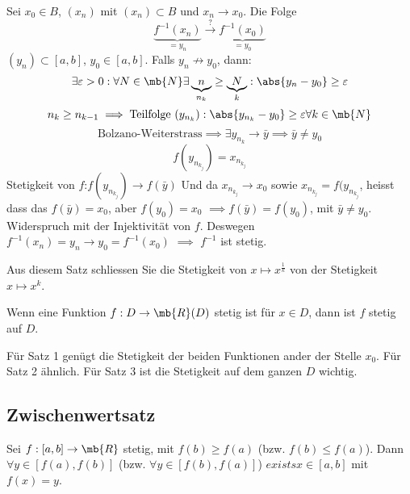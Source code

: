 \begin{Bew}
  Sei $x_0\in B$, $(x_n)$ mit $(x_n)\subset B$ und $x_n\to x_0$. Die Folge
  \[\underbrace{f^{-1}(x_n)}_{=y_n}\stackrel{?}{\to}\underbrace{f^{-1}(x_0)}_{=y_0}\]
  $(y_n)\subset\left[ a,b \right]$, $y_0\in\left[ a,b \right]$. Falls $y_n\not\to y_0$, dann:
  \[\exists\varepsilon>0: \forall N\in\mb{N}\exists \underbrace{n}_{n_k}\geq \underbrace{N}_{k}: \abs{y_n-y_0}\geq\varepsilon\]
  \[n_k\geq n_{k-1}\implies\text{Teilfolge } (y_{n_k}): \abs{y_{n_k}-y_0}\geq \varepsilon\forall k\in \mb{N}\]
  \[\text{Bolzano-Weiterstrass}\implies \exists y_{n_k}\to\bar{y}\implies \bar{y}\neq y_0\]
  \[f(y_{n_{k_j}})=x_{n_{k_j}}\]
  Stetigkeit von $f$:$f(y_{n_{k_j}})\to f(\bar y)$ Und da $x_{n_{k_j}}\to x_0$ sowie  $x_{n_{k_j}} = f(y_{n_{k_j}}$, heisst dass das $f(\bar y)=x_0$, aber $f(y_0)=x_0$ $\implies f(\bar y)=f(y_0)$, mit $\bar y\neq y_0$. Widerspruch mit der Injektivität von $f$. Deswegen $f^{-1}(x_n)=y_n\to y_0=f^{-1}(x_0)$ $\implies$ $f^{-1}$ ist stetig.
\end{Bew}
\begin{Bem}
  Aus diesem Satz schliessen Sie die Stetigkeit von $x\mapsto x^{\frac{1}{k}}$ von der Stetigkeit $x\mapsto x^k$.
\end{Bem}
\begin{Def}
  Wenn eine Funktion $f:D\to\mb{R}(D)$ stetig ist für $x\in D$, dann ist $f$ stetig auf $D$.
\end{Def}
\begin{Bem}
  Für Satz 1 genügt die Stetigkeit der beiden Funktionen ander der Stelle $x_0$. Für Satz 2 ähnlich. Für Satz 3 ist die Stetigkeit auf dem ganzen $D$ wichtig.
\end{Bem}
\subsection{Zwischenwertsatz}
\begin{Sat}
  Sei $f:\left[ a,b \right]\to\mb{R}$ stetig, mit $f(b)\geq f(a)$ (bzw. $f(b)\leq f(a)$). Dann $\forall y\in\left[ f(a),f(b) \right]$ (bzw. $\forall y\in\left[ f(b),f(a) \right]$) $exists x\in\left[ a,b \right]$ mit $f(x)=y$.
\end{Sat}
